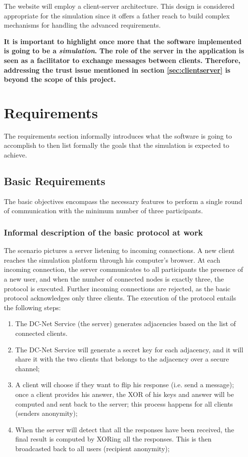 The website will employ a client-server architecture. This design is considered appropriate for the simulation since it offers a father reach to build complex mechanisms for handling the advanced requirements. \newline

\textbf{It is important to highlight once more that the software implemented is going to be a \emph{simulation}. The role of the server in the application is seen as a facilitator to exchange messages between clients. Therefore, addressing the trust issue mentioned in section \ref{sec:clientserver} is beyond the scope of this project.}


\section{Requirements} \label{sec:requirements}
The requirements section informally introduces what the software is going to accomplish to then list formally the goals that the simulation is expected to achieve.

\subsection{Basic Requirements}
The basic objectives encompass the necessary features to perform a single round of communication with the minimum number of three participants.

\subsubsection{Informal description of the basic protocol at work}
The scenario pictures a server listening to incoming connections. A new client reaches the simulation platform through his computer's browser. At each incoming connection, the server communicates to all participants the presence of a new user, and when the number of connected nodes is exactly three, the protocol is executed. Further incoming connections are rejected, as the basic protocol acknowledges only three clients. The execution of the protocol entails the following steps:
\begin{enumerate}
    \item The DC-Net Service (the server) generates adjacencies based on the list of connected clients.
    \item The DC-Net Service will generate a secret key for each adjacency, and it will share it with the two clients that belongs to the adjacency over a secure channel;
    \item A client will choose if they want to flip his response (i.e. send a message); once a client provides his answer, the XOR of his keys and answer will be computed and sent back to the server; this process happens for all clients (senders anonymity);
    \item When the server will detect that all the responses have been received, the final result is computed by XORing all the responses. This is then broadcasted back to all users (recipient anonymity);
\end{enumerate}

